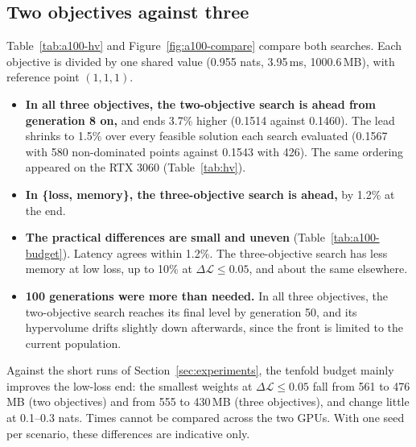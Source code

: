 \documentclass[11pt]{article}
\newcommand{\dloss}{\Delta\mathcal{L}}
\begin{document}
\subsection{Two objectives against three}
Table~\ref{tab:a100-hv} and Figure~\ref{fig:a100-compare} compare both searches. Each objective is divided
by one shared value (0.955 nats, 3.95\,ms, 1000.6\,MB), with reference point $(1,1,1)$.
\begin{itemize}
  \item \textbf{In all three objectives, the two-objective search is ahead from generation 8 on,} and ends
        3.7\% higher (0.1514 against 0.1460). The lead shrinks to 1.5\% over every feasible solution each
        search evaluated (0.1567 with 580 non-dominated points against 0.1543 with 426). The same
        ordering appeared on the RTX 3060 (Table~\ref{tab:hv}).
  \item \textbf{In \{loss, memory\}, the three-objective search is ahead,} by 1.2\% at the end.
  \item \textbf{The practical differences are small and uneven} (Table~\ref{tab:a100-budget}). Latency
        agrees within 1.2\%. The three-objective search has less memory at low loss, up to 10\% at
        $\dloss\le0.05$, and about the same elsewhere.
  \item \textbf{100 generations were more than needed.} In all three objectives, the two-objective search
        reaches its final level by generation 50, and its hypervolume drifts slightly down afterwards, since
        the front is limited to the current population.
\end{itemize}
Against the short runs of Section~\ref{sec:experiments}, the tenfold budget mainly improves the low-loss
end: the smallest weights at $\dloss\le0.05$ fall from 561 to 476\,MB (two objectives) and from 555 to
430\,MB (three objectives), and change little at 0.1--0.3 nats. Times cannot be compared across the two
GPUs. With one seed per scenario, these differences are indicative only.
\end{document}
